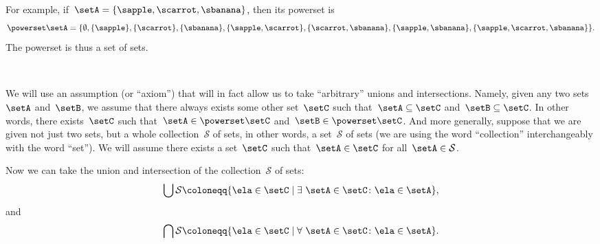 For example, if~$\setA = \{ \sapple, \scarrot, \sbanana \}$, then its powerset is
\begin{equation*}
    \powerset \setA = \{ \emptyset, \{ \sapple \}, \{ \scarrot \}, \{ \sbanana\}, \{ \sapple, \scarrot \}, \{ \scarrot, \sbanana \}, \{ \sapple, \sbanana\}, \{ \sapple, \scarrot, \sbanana \} \}.
\end{equation*}
The powerset is thus a set of sets.


\


We will use an assumption (or ``axiom'') that will in fact allow us to take ``arbitrary'' unions and intersections.
Namely, given any two sets~$\setA$ and~$\setB$, we assume that there always exists some other set~$\setC$ such that~$\setA \subseteq \setC$ and~$\setB \subseteq \setC$.
In other words, there exists~$\setC$ such that~$\setA \in \powerset \setC$ and~$\setB \in \powerset \setC$.
And more generally, suppose that we are given not just two sets, but a whole collection~$\mathcal{S}$ of sets, in other words, a set~$\mathcal{S}$ of sets (we are using the word ``collection'' interchangeably with the word ``set'').
We will assume there exists a set~$\setC$ such that~$\setA \in \setC$ for all~$\setA \in \mathcal{S}$.



Now we can take the union and intersection of the collection~$\mathcal{S}$ of sets:
%
\begin{equation*}
    \bigcup \mathcal{S} \coloneqq \{ \ela \in \setC \mid \exists \  \setA \in \setC \colon \ela \in \setA \},
\end{equation*}
%
and
%
\begin{equation*}
    \bigcap \mathcal{S} \coloneqq \{ \ela \in \setC \mid \forall \  \setA \in \setC \colon \ela \in \setA \}.
\end{equation*}


